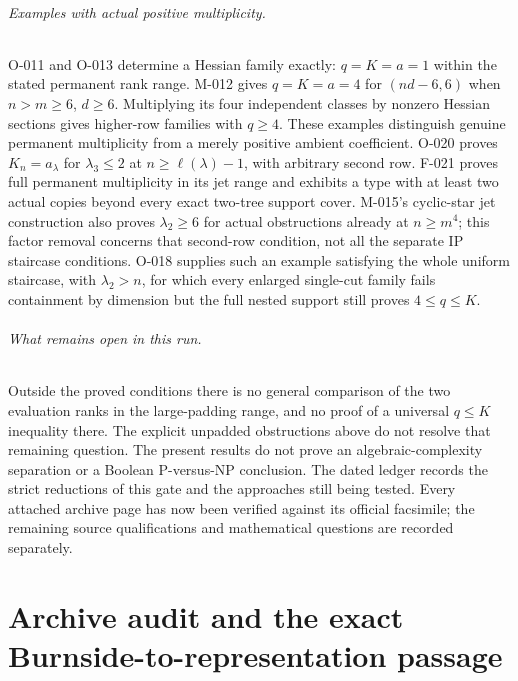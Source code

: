 \documentclass[11pt]{article}
\begin{document}
\paragraph{Examples with actual positive multiplicity.}
O-011 and O-013 determine a Hessian family exactly:
\(q=K=a=1\) within the stated permanent rank range.
M-012 gives \(q=K=a=4\) for \((nd-6,6)\) when
\(n>m\geq6\), \(d\geq6\). Multiplying its four independent
classes by nonzero Hessian sections gives higher-row families
with \(q\geq4\). These examples distinguish genuine
permanent multiplicity from a merely positive ambient coefficient.
O-020 proves \(K_n=a_\lambda\) for \(\lambda_3\leq2\)
at \(n\geq\ell(\lambda)-1\), with arbitrary second row.
F-021 proves full permanent multiplicity in its jet range and
exhibits a type with at least two actual copies beyond every
exact two-tree support cover. M-015's cyclic-star jet construction
also proves \(\lambda_2\geq6\) for actual obstructions already
at \(n\geq m^4\); this factor removal concerns that second-row
condition, not all the separate IP staircase conditions.
O-018 supplies such an example satisfying the whole uniform
staircase, with \(\lambda_2>n\), for which every enlarged
single-cut family fails containment by dimension but the full
nested support still proves \(4\leq q\leq K\).

\paragraph{What remains open in this run.}
Outside the proved conditions there is no general comparison
of the two evaluation ranks in the large-padding range, and no
proof of a universal \(q\leq K\) inequality there. The explicit
unpadded obstructions above do not resolve that remaining question. The present
results do not prove an algebraic-complexity separation or a
Boolean P-versus-NP conclusion. The dated ledger records the
strict reductions of this gate and the approaches still being
tested. Every attached archive page has now been verified against
its official facsimile; the remaining source qualifications and
mathematical questions are recorded separately.
\clearpage

\part{Archive audit and the exact Burnside-to-representation passage}

\end{document}
